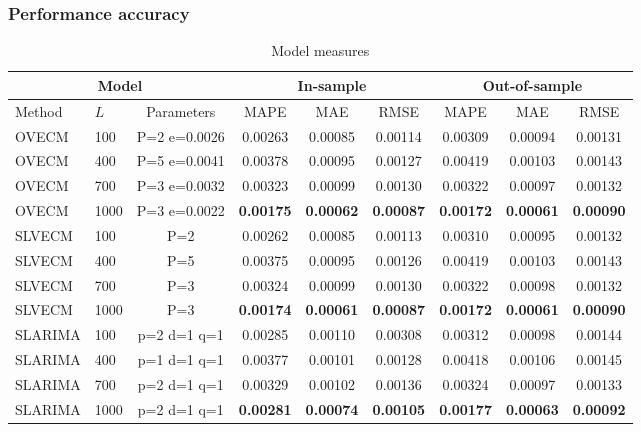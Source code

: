 \documentclass[xcolor=dvipsnames]{beamer}
\begin{document}
\begin{frame}
\frametitle{Performance accuracy}
\tiny
\begin{table}[H]
\caption{Model measures}
\label{tab:stats}
\begin{center}
\begin{tabular}{|l|l|c|c|c|c|c|c|c|}
\hline
\multicolumn{3}{|c|}{Model} & \multicolumn{3}{|c|}{In-sample} &
\multicolumn{3}{|c|}{Out-of-sample} \\ 
\hline
\hline
Method & $L$ & Parameters &  
MAPE & MAE& RMSE& 
MAPE & MAE& RMSE \\
\hline
 OVECM  &   100  &  P=2 e=0.0026 &  0.00263&  0.00085&  0.00114&  0.00309&  0.00094&  0.00131\\
 OVECM  &   400  &  P=5 e=0.0041&  0.00378&  0.00095&  0.00127&  0.00419&  0.00103&  0.00143\\
 OVECM  &   700  &  P=3 e=0.0032&  0.00323&  0.00099&  0.00130&  0.00322&  0.00097&  0.00132\\
 OVECM  &   1000 &  P=3 e=0.0022&  
 \textbf{0.00175}&  \textbf{0.00062}&  \textbf{0.00087} &  
 \textbf{0.00172}&  \textbf{0.00061}&  \textbf{0.00090}\\
\hline
 SLVECM  &   100 &  P=2 &  0.00262&  0.00085&  0.00113&  0.00310&  0.00095&  0.00132\\
 SLVECM  &   400 &  P=5 &  0.00375&  0.00095&  0.00126&  0.00419&  0.00103&  0.00143\\
 SLVECM  &   700 &  P=3 &  0.00324&  0.00099&  0.00130&  0.00322&  0.00098&  0.00132\\
 SLVECM  &   1000&  P=3 &  
 \textbf{0.00174}&  \textbf{0.00061}&  \textbf{0.00087}&  
 \textbf{0.00172}&  \textbf{0.00061}&  \textbf{0.00090}\\
\hline
SLARIMA & 100  &p=2 d=1 q=1 & 0.00285  &  0.00110  &  0.00308  &  0.00312  &0.00098  &  0.00144 \\
SLARIMA & 400  &p=1 d=1 q=1 & 0.00377  &  0.00101  &  0.00128  &  0.00418 & 0.00106 & 0.00145 \\
SLARIMA & 700  &p=2 d=1 q=1 & 0.00329  &  0.00102  &  0.00136  &  0.00324  & 0.00097  &  0.00133 \\
SLARIMA & 1000 &p=2 d=1 q=1 & \textbf{0.00281}  & \textbf{0.00074}  &  \textbf{0.00105}  &  \textbf{0.00177} & \textbf{0.00063}  &  \textbf{0.00092} \\
\hline
\end{tabular}
\end{center}
\end{table}
\end{frame}
\end{document}
